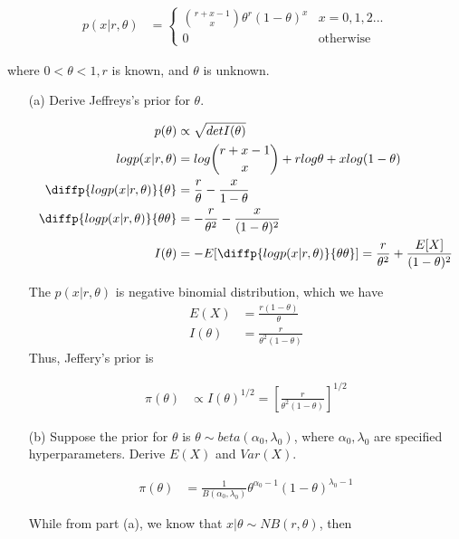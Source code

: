 \documentclass[11pt]{article} %
\begin{document}
\begin{align}
	p(x|r, \theta) &= \begin{cases} 
		{r+x-1 \choose x} \theta^{r} (1-\theta)^{x} & x=0,1,2...\\
	     0 & \text{otherwise}
	\end{cases}
\end{align}

where $0< \theta < 1, r$ is known, and $\theta$ is unknown.

\begin{itemize}
	\item [(a)] Derive Jeffreys's prior for $\theta$. 
	
\begin{align*}
	p(\theta) & \propto \sqrt{det I(\theta)} \\
	log p(x|r, \theta) &= log {r+x-1 \choose x} + rlog \theta + x log(1-\theta) \\
	\diffp{log p(x|r, \theta)}{\theta} &= \frac{r}{\theta} - \frac{x}{1-\theta} \\
	\diffp{log p(x|r, \theta)}{\theta \theta} &= -\frac{r}{\theta^2} - \frac{x}{(1-\theta)^2} \\
	I(\theta) &= -E[\diffp{log p(x|r, \theta)}{\theta \theta} ] = \frac{r}{\theta^2} + \frac{E[X]}{(1-\theta)^2}
\end{align*}	
	
	The $p(x|r, \theta)$ is negative binomial distribution, which we have 
\begin{align*}
	E(X) &= \frac{r(1-\theta)}{\theta} \\
	I(\theta) &= \frac{r}{\theta^2 (1-\theta)}
\end{align*}	
Thus, Jeffery's prior is 

\begin{align*}
	\pi(\theta) & \propto  I(\theta)^{1/2} = [\frac{r}{\theta^2 (1-\theta)}]^{1/2}
\end{align*}	
	
	\item[(b)] Suppose the prior for $\theta$ is $\theta \sim beta(\alpha_0, \lambda_0)$, where $\alpha_0, \lambda_0$ are specified hyperparameters. Derive $E(X)$ and $Var(X)$.
	
	\begin{align*}
		\pi(\theta)	&= \frac{1}{B(\alpha_0, \lambda_0)} \theta^{\alpha_0 -1} (1-\theta)^{\lambda_0 -1} 
	\end{align*}	
	
	While from part (a), we know that $x|\theta \sim NB(r, \theta)$, then 
	

\end{itemize}
\end{document}
